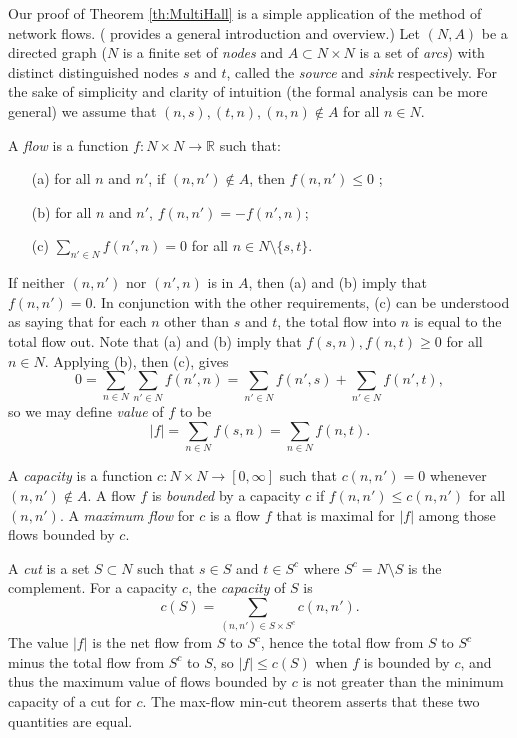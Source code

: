 \documentclass[12pt, A4paper]{article}
\theoremstyle{definition}
\renewcommand{\Re}{\mathbb{R}}
\begin{document}
Our proof of Theorem \ref{th:MultiHall} is a simple application of the method of network flows.  (\cite{AhMaOr93} provides a general introduction and overview.)  Let $(N,A)$ be a directed graph ($N$ is a finite set of \emph{nodes} and $A \subset N \times N$ is a set of \emph{arcs}) with distinct distinguished nodes $s$ and $t$, called the \emph{source} and \emph{sink} respectively.  For the sake of simplicity and clarity of intuition (the formal analysis can be more general) we assume that $(n, s), (t,n), (n,n) \notin A$ for all $n \in N$.

A \emph{flow} is a function $f \colon N \times N \to \Re$ such that:
\begin{enumerate}
  \item[(a)] for all $n$ and $n'$, if $(n,n') \notin A$, then $f(n,n') \le 0$ ; 
  \item[(b)] for all $n$ and $n'$,  $f(n,n') = - f(n',n)$; 
  \item[(c)] $\sum_{n' \in N} f(n',n) = 0$ for all $n \in N \setminus \{s,t\}$. 
\end{enumerate}
If neither $(n,n')$ nor $(n',n)$ is in $A$, then (a) and (b) imply that $f(n,n') = 0$.  
In conjunction with the other requirements, (c) can be understood as saying that for each $n$ other than $s$ and $t$, the total flow into $n$ is equal to the total flow out.  Note that (a) and (b) imply that $f(s,n), f(n,t) \ge 0$ for all $n \in N$.  Applying (b), then (c), gives
$$0 = \sum_{n \in N}\sum_{n' \in N} f(n',n) = \sum_{n' \in N} f(n',s) + \sum_{n' \in N} f(n',t),$$
so we may define \emph{value} of $f$ to be
$$|f| = \sum_{n \in N} f(s,n) = \sum_{n \in N} f(n,t).$$

A \emph{capacity} is a function $c \colon N \times N \to [0,\infty]$ such that $c(n,n') = 0$ whenever $(n,n') \notin A$.  
A flow $f$ is \emph{bounded} by a capacity $c$ if $f(n,n') \le c(n,n')$ for all $(n,n')$.  A \emph{maximum flow} for $c$ is a flow $f$ that is maximal for $|f|$ among those flows bounded by $c$.  

A \emph{cut} is a set $S \subset N$ such that $s \in S$ and $t \in S^c$ where $S^c = N \setminus S$ is the complement.  For a capacity $c$, the \emph{capacity} of $S$ is
$$c(S) = \sum_{(n,n') \in S \times S^c} c(n,n').$$  The value $|f|$ is the net flow from $S$ to $S^c$, hence the total flow from $S$ to $S^c$ minus the total flow from $S^c$ to $S$, so $|f| \le c(S)$ when $f$ is bounded by $c$, and thus the maximum value of flows bounded by $c$ is not greater than the minimum capacity of a cut for $c$.  The max-flow min-cut theorem \citep{FoFu56} asserts that these two quantities are equal. 
  
\end{document}
